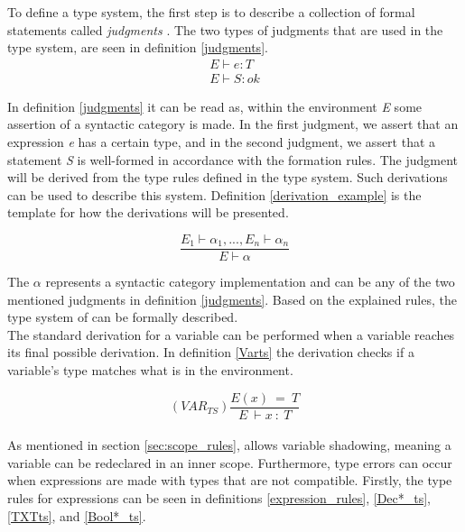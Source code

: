 \noindent To define a type system, the first step is to describe a collection of formal statements called \textit{judgments} \cite{SS_lecture_10}. The two types of judgments that are used in the type system, are seen in definition \ref{judgments}\cite{SS_lecture_10}. 
\begin{equation} \label{judgments}
    \begin{split}
        E \vdash e:T \\ E \vdash S:ok
    \end{split}
\end{equation}

\noindent
In definition \ref{judgments} it can be read as, within the environment \textit{E} some assertion of a syntactic category is made. In the first judgment, we assert that an expression \textit{e} has a certain type, and in the second judgment, we assert that a statement \textit{S} is well-formed in accordance with the formation rules. The judgment will be derived from the type rules defined in the type system. Such derivations can be used to describe this system. Definition \ref{derivation_example} is the template for how the derivations will be presented\cite{SS_lecture_10}.

\begin{equation} \label{derivation_example}
    \frac{E_1 \vdash \alpha_1 , ..., E_n \vdash \alpha_n}{E \vdash \alpha}
\end{equation} 

\noindent The $\alpha$ represents a syntactic category implementation and can be any of the two mentioned judgments in definition \ref{judgments}. Based on the explained rules, the type system of \lang can be formally described. \\

The standard derivation for a variable can be performed when a variable reaches its final possible derivation. In definition \ref{Varts} the derivation checks if a variable's type matches what is in the environment.

\begin{equation} \label{Varts}
    (VAR_{TS})\frac{E(x) \ = \ T}{E \ \vdash x \ : \ T}
\end{equation} \\

\noindent As mentioned in section \ref{sec:scope_rules}, \lang allows 
variable shadowing, meaning a variable can be redeclared in an inner scope. Furthermore, type errors can occur when expressions are made with types that are not compatible. 
Firstly, the type rules for expressions can be seen in definitions \ref{expression_rules}, \ref{Dec*_ts}, \ref{TXTts}, and \ref{Bool*_ts}.

